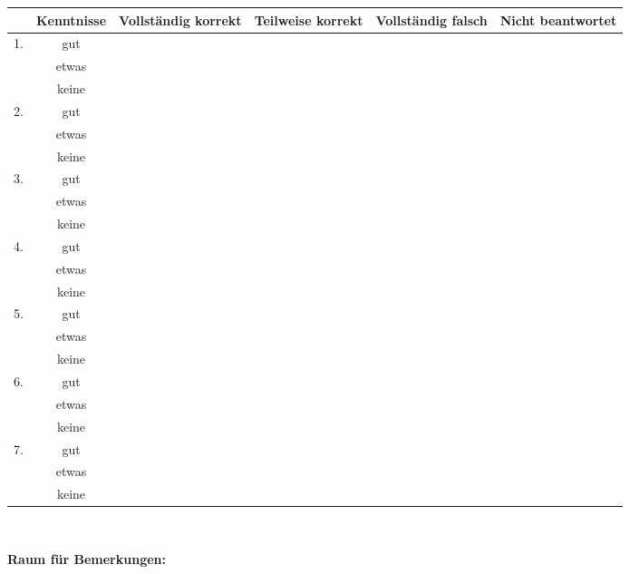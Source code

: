 \documentclass[12pt]{exam}
\begin{document}
\begin{tabular}{|l|c|c|c|c|c|}\hline
 & Kenntnisse & Vollständig korrekt & Teilweise korrekt & Vollständig falsch & Nicht beantwortet \\\hline
1. &gut&&&&\\\cline{2-6}
   &etwas&&&&\\\cline{2-6}
   &keine&&&&\\\hline
2. &gut&&&&\\\cline{2-6}
   &etwas&&&&\\\cline{2-6}
   &keine&&&&\\\hline
3. &gut&&&&\\\cline{2-6}
   &etwas&&&&\\\cline{2-6}
   &keine&&&&\\\hline
4. &gut&&&&\\\cline{2-6}
   &etwas&&&&\\\cline{2-6}
   &keine&&&&\\\hline
5. &gut&&&&\\\cline{2-6}
   &etwas&&&&\\\cline{2-6}
   &keine&&&&\\\hline
6. &gut&&&&\\\cline{2-6}
   &etwas&&&&\\\cline{2-6}
   &keine&&&&\\\hline
7. &gut&&&&\\\cline{2-6}
   &etwas&&&&\\\cline{2-6}
   &keine&&&&\\\hline
\end{tabular}

${}$\enlargethispage{2cm}

{\bf Raum für Bemerkungen:}

\clearpage
\end{document}
